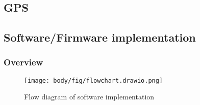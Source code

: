 %
%
%
%

\subsection{GPS}

\pagebreak
\subsection{Software/Firmware implementation}
\subsubsection{Overview}

\begin{figure}[!htb]
	\centering
	\texttt{[image: body/fig/flowchart.drawio.png]}
	\caption{Flow diagram of software implementation }
	\label{fig:softwareoverview}
\end{figure}

